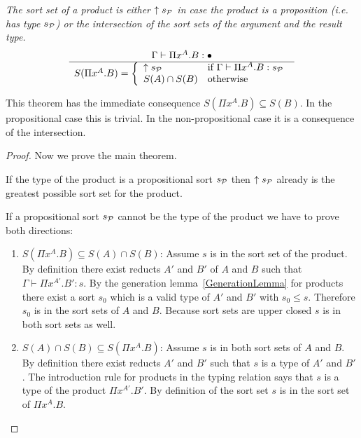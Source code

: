 \begin{theorem}
    \label{thm:SortSetProduct}
    \emph{The sort set of a product is either ${\uparrow s_{\cal P}}$ in case the
    product is a proposition (i.e. has type $s_{\cal P}$) or the intersection of
the sort sets of the argument and the result type.}
    $$
    \ruleh{
        \Gamma \vdash \Pi x^A. B : \dontcare
    }
    {
        S(\Pi x^A. B) =
        \dcases{
            \upper{s_\Prop} & \text{if }\Gamma \vdash \Pi x^A . B : s_\Prop
            \\
            S(A) \cap S(B) & \text{otherwise}
        }
    }
    $$

    This theorem has the immediate consequence $S(\Pi x^A. B) \subseteq S(B)$. In
    the propositional case this is trivial. In the non-propositional case it is
    a consequence of the intersection.

    \begin{proof}
        Now we prove the main theorem.

        If the type of the product is a propositional sort $s_{\cal P}$ then
        ${\uparrow s_{\cal P}}$ already is the greatest possible sort set for the
        product.

        If a propositional sort $s_{\cal P}$ cannot be the type of the product we
        have to prove both directions:
        \begin{enumerate}
            \item $S(\Pi x^A. B) \subseteq S(A) \cap S(B)$:
                Assume $s$ is in the sort set of the product. By definition
                there exist reducts $A'$ and $B'$ of $A$ and $B$ such that
                $\Gamma \vdash \Pi x^{A'}. B' : s$. By the generation
                lemma~\ref{GenerationLemma} for products there exist a sort
                $s_0$ which is a valid type of $A'$ and $B'$ with $s_0 \le s$.
                Therefore $s_0$ is in the sort sets of $A$ and $B$. Because sort
                sets are upper closed $s$ is in both sort sets as well.

            \item $S(A) \cap S(B) \subseteq S(\Pi x^A. B)$:
                Assume $s$ is in both sort sets of $A$ and $B$. By definition
                there exist reducts $A'$ and $B'$ such that $s$ is a type of
                $A'$ and $B'$. The introduction rule for products in the typing
                relation says that $s$ is a type of the product $\Pi x^{A'}.
                B'$. By definition of the sort set $s$ is in the sort set of
                $\Pi x^A. B$.
        \end{enumerate}
    \end{proof}
\end{theorem}






